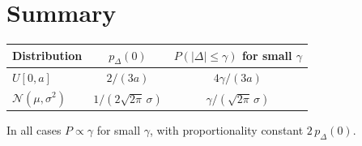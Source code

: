 \documentclass[a4paper,11pt]{article}
\begin{document}
\section{Summary}

\begin{center}
\renewcommand{\arraystretch}{1.4}
\begin{tabular}{lcc}
\hline
Distribution & $p_\Delta(0)$ & $P(|\Delta|\leq\gamma)$ for small $\gamma$ \\
\hline
$U[0,a]$   & $2/(3a)$ & $4\gamma/(3a)$ \\
$\mathcal{N}(\mu,\sigma^2)$ & $1/(2\sqrt{2\pi}\,\sigma)$
  & $\gamma/(\sqrt{2\pi}\,\sigma)$ \\
\hline
\end{tabular}
\end{center}

In all cases $P \propto \gamma$ for small $\gamma$, with proportionality
constant $2\,p_\Delta(0)$.
\end{document}
